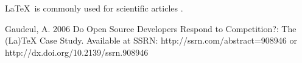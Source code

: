 \documentclass{article}
\begin{document}
\LaTeX~is commonly used for scientific articles \cite{gaudeul2006}.

\begin{thebibliography}{9}

  Gaudeul, A.
  2006
  Do Open Source Developers Respond to Competition?: The (La)TeX Case Study.
  Available at SSRN: http://ssrn.com/abstract=908946 or http://dx.doi.org/10.2139/ssrn.908946
\end{thebibliography}
\end{document}
